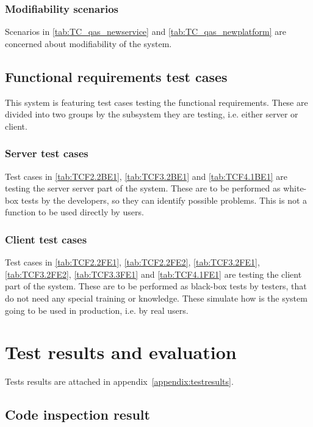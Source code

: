 \documentclass[11pt]{book}
\begin{document}
\subsubsection{Modifiability scenarios}
Scenarios in \ref{tab:TC_qas_newservice} and \ref{tab:TC_qas_newplatform} are concerned about modifiability of the system.

\subsection{Functional requirements test cases}

This system is featuring test cases testing the functional requirements. These are divided into two groups by the subsystem they are testing, i.e. either server or client.

\subsubsection{Server test cases}

Test cases in \ref{tab:TCF2.2BE1}, \ref{tab:TCF3.2BE1} and \ref{tab:TCF4.1BE1} are testing the server server part of the system. These are to be performed as white-box tests by the developers, so they can identify possible problems. This is not a function to be used directly by users.

\subsubsection{Client test cases} \label{sec:fe-test-cases}

Test cases in \ref{tab:TCF2.2FE1}, \ref{tab:TCF2.2FE2}, \ref{tab:TCF3.2FE1}, \ref{tab:TCF3.2FE2}, \ref{tab:TCF3.3FE1} and \ref{tab:TCF4.1FE1} are testing the client part of the system. These are to be performed as black-box tests by testers, that do not need any special training or knowledge. These simulate how is the system going to be used in production, i.e. by real users.

\section{Test results and evaluation}

Tests results are attached in appendix~\ref{appendix:testresults}.

\subsection{Code inspection result}
\end{document}
